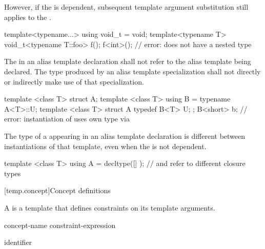 \pnum
However, if the  is dependent, subsequent template
argument substitution still applies to the .
\begin{example}
\begin{codeblock}
template<typename...> using void_t = void;
template<typename T> void_t<typename T::foo> f();
f<int>();           // error:  does not have a nested type 
\end{codeblock}
\end{example}

\pnum
The  in an alias template declaration shall not refer to
the alias template being declared. The type produced by an alias template
specialization shall not directly or indirectly make use of that specialization.
\begin{example}
\begin{codeblock}
template <class T> struct A;
template <class T> using B = typename A<T>::U;
template <class T> struct A {
  typedef B<T> U;
};
B<short> b;         // error: instantiation of  uses own type via 
\end{codeblock}
\end{example}

\pnum
The type of a 
appearing in an alias template declaration
is different between instantiations of that template,
even when the  is not dependent.
\begin{example}
\begin{codeblock}
template <class T>
  using A = decltype([] { });   //  and  refer to different closure types
\end{codeblock}
\end{example}

[temp.concept]{Concept definitions}

\pnum
A  is a template
that defines constraints on its template arguments.

\begin{bnf}
\br
   concept-name \terminal{=} constraint-expression \terminal{;}
\end{bnf}

\begin{bnf}
\br
  identifier
\end{bnf}

